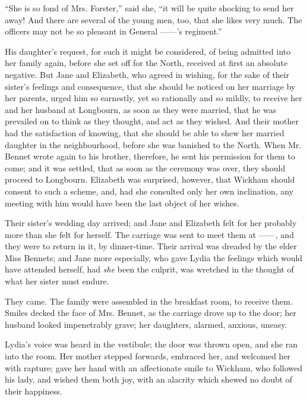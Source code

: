 “She is so fond of Mrs. Forster,” said she, “it will be
quite shocking to send her away! And there are several
of the young men, too, that she likes very much. The
officers may not be so pleasant in General ------’s
regiment.”

His daughter’s request, for such it might be considered,
of being admitted into her family again, before she set
off for the North, received at first an absolute negative.
But Jane and Elizabeth, who agreed in wishing, for the
sake of their sister’s feelings and consequence, that she
should be noticed on her marriage by her parents, urged
him so earnestly, yet so rationally and so mildly, to receive
her and her husband at Longbourn, as soon as they were
married, that he was prevailed on to think as they thought,
and act as they wished. And their mother had the satisfaction
of knowing, that she should be able to shew her
married daughter in the neighbourhood, before she was
banished to the North. When Mr. Bennet wrote again
to his brother, therefore, he sent his permission for them
to come; and it was settled, that as soon as the ceremony
was over, they should proceed to Longbourn. Elizabeth
was surprised, however, that Wickham should consent to
such a scheme, and, had she consulted only her own inclination,
any meeting with him would have been the last
object of her wishes.


Their sister’s wedding day arrived; and Jane and
Elizabeth felt for her probably more than she felt for
herself. The carriage was sent to meet them at ------,
and they were to return in it, by dinner-time. Their
arrival was dreaded by the elder Miss Bennets; and Jane
more especially, who gave Lydia the feelings which would
have attended herself, had \textit{she} been the culprit, was
wretched in the thought of what her sister must endure.

They came. The family were assembled in the breakfast
room, to receive them. Smiles decked the face of
Mrs. Bennet, as the carriage drove up to the door; her
husband looked impenetrably grave; her daughters,
alarmed, anxious, uneasy.

Lydia’s voice was heard in the vestibule; the door was
thrown open, and she ran into the room. Her mother
stepped forwards, embraced her, and welcomed her with
rapture; gave her hand with an affectionate smile to
Wickham, who followed his lady, and wished them both
joy, with an alacrity which shewed no doubt of their
happiness.

